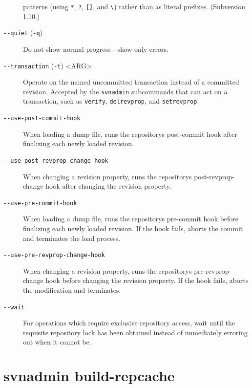 \begin{description}
patterns (using \texttt{*}, \texttt{?}, \texttt{{[}{]}}, and
\texttt{\textbackslash{}}) rather than as literal prefixes. (Subversion
1.10.)
\item[\protect\phantomsection\label{svn.ref.svnadmin.sw.quiet}{}\texttt{-\/-quiet}
(\texttt{-q})]
Do not show normal progress---show only errors.
\item[\protect\phantomsection\label{svn.ref.svnadmin.sw.transaction}{}\texttt{-\/-transaction}
(\texttt{-t}) \textless ARG\textgreater{}]
Operate on the named uncommitted transaction instead of a committed
revision. Accepted by the \texttt{svnadmin} subcommands that can act on a
transaction, such as \texttt{verify}, \texttt{delrevprop}, and
\texttt{setrevprop}.
\item[\protect\phantomsection\label{svn.ref.svnadmin.sw.use_post_commit_hook}{}\texttt{-\/-use-post-commit-hook}]
When loading a dump file, runs the repository\textquotesingle s
post-commit hook after finalizing each newly loaded revision.
\item[\protect\phantomsection\label{svn.ref.svnadmin.sw.use_post_revprop_change_hook}{}\texttt{-\/-use-post-revprop-change-hook}]
When changing a revision property, runs the repository\textquotesingle s
post-revprop-change hook after changing the revision property.
\item[\protect\phantomsection\label{svn.ref.svnadmin.sw.use_pre_commit_hook}{}\texttt{-\/-use-pre-commit-hook}]
When loading a dump file, runs the repository\textquotesingle s
pre-commit hook before finalizing each newly loaded revision. If the
hook fails, aborts the commit and terminates the load process.
\item[\protect\phantomsection\label{svn.ref.svnadmin.sw.use_pre_revprop_change_hook}{}\texttt{-\/-use-pre-revprop-change-hook}]
When changing a revision property, runs the repository\textquotesingle s
pre-revprop-change hook before changing the revision property. If the
hook fails, aborts the modification and terminates.
\item[\protect\phantomsection\label{svn.ref.svnadmin.sw.wait}{}\texttt{-\/-wait}]
For operations which require exclusive repository access, wait until the
requisite repository lock has been obtained instead of immediately
erroring out when it cannot be.
\end{description}

\section{svnadmin
build-repcache}\label{svn.ref.svnadmin.c.build-repcache}

